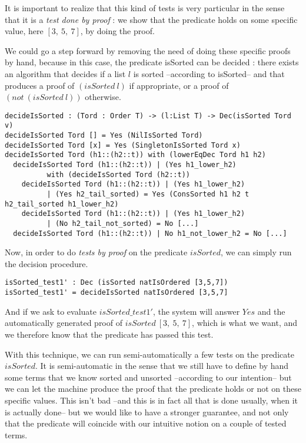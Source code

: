 It is important to realize that this kind of tests is very particular in the sense that it is a \emph{test done by proof} : we show that the predicate holds on some specific value, here $[3,\ 5,\ 7]$, by doing the proof.

We could go a step forward by removing the need of doing these specific proofs by hand, because in this case, the predicate isSorted can be decided : there exists an algorithm that decides if a list $l$ is sorted --according to isSorted-- and that produces a proof of $(isSorted\ l)$ if appropriate, or a proof of $(not\ (isSorted\ l))$ otherwise.

\begin{lstlisting}
decideIsSorted : (Tord : Order T) -> (l:List T) -> Dec(isSorted Tord v)
decideIsSorted Tord [] = Yes (NilIsSorted Tord)
decideIsSorted Tord [x] = Yes (SingletonIsSorted Tord x)
decideIsSorted Tord (h1::(h2::t)) with (lowerEqDec Tord h1 h2)
  decideIsSorted Tord (h1::(h2::t)) | (Yes h1_lower_h2) 
          with (decideIsSorted Tord (h2::t))
    decideIsSorted Tord (h1::(h2::t)) | (Yes h1_lower_h2) 
          | (Yes h2_tail_sorted) = Yes (ConsSorted h1 h2 t h2_tail_sorted h1_lower_h2)
    decideIsSorted Tord (h1::(h2::t)) | (Yes h1_lower_h2) 
          | (No h2_tail_not_sorted) = No [...]
  decideIsSorted Tord (h1::(h2::t)) | No h1_not_lower_h2 = No [...]
\end{lstlisting}
Now, in order to do \emph{tests by proof} on the predicate $isSorted$, we can simply run the decision procedure.

\begin{lstlisting}
isSorted_test1' : Dec (isSorted natIsOrdered [3,5,7])
isSorted_test1' = decideIsSorted natIsOrdered [3,5,7] 
\end{lstlisting}
And if we ask to evaluate $isSorted\_test1'$, the system will answer $Yes$ and the automatically generated proof of $isSorted\ [3,\ 5,\ 7]$, which is what we want, and we therefore know that the predicate has passed this test.

With this technique, we can run semi-automatically a few tests on the predicate $isSorted$. It is semi-automatic in the sense that we still have to define by hand some terms that we know sorted and unsorted --according to our intention-- but we can let the machine produce the proof that the predicate holds or not on these specific values. This isn't bad --and this is in fact all that is done usually, when it is actually done-- but we would like to have a stronger guarantee, and not only that the predicate will coincide with our intuitive notion on a couple of tested terms.





